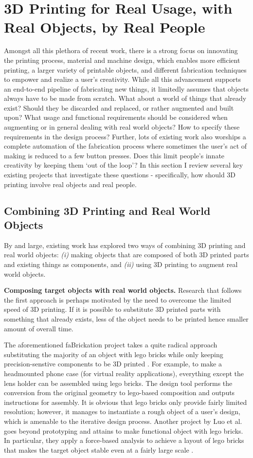 \section{3D Printing for Real Usage, with Real Objects, by Real People}
Amongst all this plethora of recent work, there is a strong focus on innovating the printing process, material and machine design, which enables more efficient printing, a larger variety of printable objects, and different fabrication techniques to empower and realize a user's creativity. While all this advancement supports an end-to-end pipeline of fabricating new things, it limitedly assumes that objects always have to be made from scratch. What about a world of things that already exist? Should they be discarded and replaced, or rather augmented and built upon? What usage and functional requirements should be considered when augmenting or in general dealing with  real world objects? How to specify these requirements in the design process? Further, lots of existing work also worships a complete automation of the fabrication process where sometimes the user's act of making is reduced to a few button presses. Does this limit people's innate creativity by keeping them `out of the loop'? In this section I review several key existing projects that investigate these questions - specifically, how should 3D printing involve real objects and real people.


\subsection{Combining 3D Printing and Real World Objects}
By and large, existing work has explored two ways of combining 3D printing and real world objects: {\em (i)} making objects that are composed of both 3D printed parts and existing things as components, and {\em (ii)} using 3D printing to augment real world objects.

\textbf{Composing target objects with real world objects.} Research that follows the first approach is perhaps motivated by the need to overcome the limited speed of 3D printing. If it is possible to substitute 3D printed parts with something that already exists, less of the object needs to be printed hence smaller amount of overall time. 

The aforementioned faBrickation project takes a quite radical approach substituting the majority of an object with lego bricks while only keeping precision-senstive components to be 3D printed \cite{mueller2014fabrickation}. For example, to make a headmounted phone case (for virtual reality applications), everything except the lens holder can be assembled using lego bricks. The design tool performs the conversion from the original geometry to lego-based composition and outputs instructions for assembly. It is obvious that lego bricks only provide fairly limited resolution; however, it manages to instantiate a rough object of a user's design, which is amenable to the iterative design process. Another project by Luo et al. goes beyond prototyping and attains to make functional object with lego bricks. In particular, they apply a force-based analysis to achieve a layout of lego bricks that makes the target object stable even at a fairly large scale \cite{luo2015legolization}.

